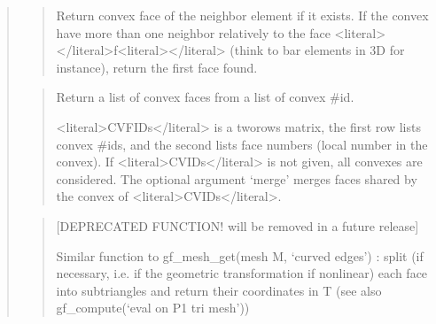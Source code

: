 \documentclass[a4paper,11pt,english]{sphinxmanual}
\begin{document}
\begin{quote}
\sphinxAtStartPar
{}
\begin{quote}

\sphinxAtStartPar
Return convex face of the neighbor element if it exists.
If the convex have more than one neighbor
relatively to the face \textless{}literal\textgreater{}\textless{}/literal\textgreater{}f\textless{}literal\textgreater{}\textless{}/literal\textgreater{} (think to bar elements in 3D for instance),
return the first face found.
\end{quote}

\sphinxAtStartPar
{}
\begin{quote}

\sphinxAtStartPar
Return a list of convex faces from a list of convex \#id.

\sphinxAtStartPar
\textless{}literal\textgreater{}CVFIDs\textless{}/literal\textgreater{} is a two\sphinxhyphen{}rows matrix, the first row lists convex \#ids,
and the second lists face numbers (local number in the convex).
If \textless{}literal\textgreater{}CVIDs\textless{}/literal\textgreater{} is not given, all convexes are considered. The optional
argument ‘merge’ merges faces shared by the convex of \textless{}literal\textgreater{}CVIDs\textless{}/literal\textgreater{}.
\end{quote}

\sphinxAtStartPar
{}
\begin{quote}

\sphinxAtStartPar
{[}DEPRECATED FUNCTION! will be removed in a future release{]}

\sphinxAtStartPar
Similar function to gf\_mesh\_get(mesh M, ‘curved edges’) : split (if
necessary, i.e. if the geometric transformation if non\sphinxhyphen{}linear)
each face into sub\sphinxhyphen{}triangles and return their coordinates in T
(see also gf\_compute(‘eval on P1 tri mesh’))
\end{quote}

\sphinxAtStartPar
{}
\begin{quote}


\end{quote}
\end{quote}
\end{document}
